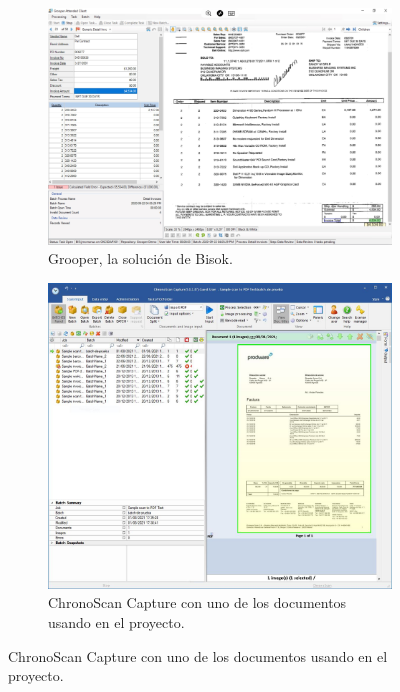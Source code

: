 \begin{figure}
    \centering
    \begin{subfigure}[b]{0.9\textwidth}
        \centering
        \includegraphics[width=\textwidth]{imaxes/b-estado-arte/bisok-grooper}
        \caption{Grooper, la solución de Bisok.}
        \label{fig:grooper-bisok}
    \end{subfigure}
    \begin{subfigure}[b]{0.8\textwidth}
        \centering
        \includegraphics[width=\textwidth]{imaxes/b-estado-arte/chronoscan-capture}
        \caption{ChronoScan Capture con uno de los documentos usando en el proyecto.}
        \label{fig:chronoscan-capture}
    \end{subfigure}
\end{figure}
